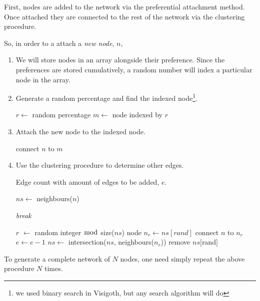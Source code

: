 \documentclass[a4paper,11pt,titlepage]{article}
\begin{document}
First, nodes are added to the network via the preferential attachment
method. Once attached they are connected to the rest of the
network via the clustering procedure.

\noindent So, in order to a attach a \emph{new node}, $n$,

\begin{enumerate}
  \item We will store nodes in an array alongside their
    preference. Since the preferences are stored cumulatively, a
    random number will index a particular node in the array.

  \item Generate a random percentage and find the indexed
    node\footnote{we used binary search in Visigoth, but any search
      algorithm will do}.

    \begin{algorithmic}
      \STATE $r \gets$ random percentage
      \STATE $m \gets$ node indexed by $r$
    \end{algorithmic}

  \item Attach the new node to the indexed node.

    \begin{algorithmic}
      \STATE connect $n$ to $m$
    \end{algorithmic}

   \item Use the clustering procedure to determine other edges.

    \begin{algorithmic}
      \REQUIRE Edge count with amount of edges to be added, $e$.

      \STATE $ns \gets$ neighbours($n$)

          \STATE \emph{break}
        \ENDIF

        \STATE $r$ $\gets$ random integer $\bmod$ size($ns$)
        \STATE node $n_r \gets ns[rand]$
          \STATE connect $n$ to $n_r$
          \STATE $e \gets e - 1$
          \STATE $ns \gets$  intersection($ns$, neighbours($n_r$))
        \ELSE
          \STATE remove $ns[$rand$]$
        \ENDIF
      \ENDWHILE
    \end{algorithmic}
\end{enumerate}

To generate a complete network of $N$ nodes, one need simply repeat
the above procedure $N$ times.
\end{document}
